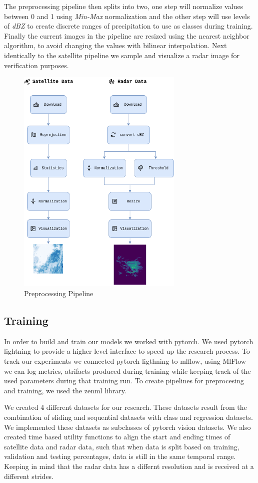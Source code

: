 \documentclass[acmtog, authorversion]{acmart}
\begin{document}
The preprocessing pipeline then splits into two, one step will normalize values between 0 and 1 using \textit{Min-Max} normalization and the other step will use levels of \textit{dBZ} to create discrete ranges of precipitation to use as classes during training.
Finally the current images in the pipeline are resized using the nearest neighbor algorithm, to avoid changing the values with bilinear interpolation.
Next identically to the satellite pipeline we sample and visualize a radar image for verification purposes.


\begin{figure}
  \centering
  \includegraphics[width=225pt]{./images/preprocessing.png}
  \caption{Preprocessing Pipeline}
  \label{fig:preprocessing}
\end{figure}

\subsection{Training}
In order to build and train our models we worked with pytorch. We used pytorch lightning to provide a higher level interface to speed up the research process. To track our experiments we connected pytorch ligthning to mlflow, using MlFlow we can log metrics, atrifacts produced during training while keeping track of the used parameters during that training run.
To create pipelines for preprocesing and training, we used the zenml library.

We created 4 different datasets for our research. These datasets result from the combination of sliding and sequential datasets with class and regression datasets.
We implemented these datasets as subclasses of pytorch vision datasets. We also created time based utility functions to align the start and ending times of satellite data and radar data, such that when data is split based on training, validation and testing percentages, data is still in the same temporal range. Keeping in mind that the radar data has a differnt resolution and is received at a different strides.
\end{document}
